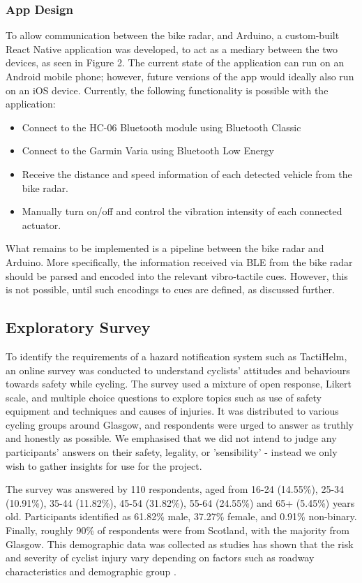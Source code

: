 \documentclass{interim}
\begin{document}
\subsubsection{App Design}
To allow communication between the bike radar, and Arduino, a custom-built React Native application was developed, to act as a mediary between the two devices, as seen in Figure 2. The current state of the application can run on an Android mobile phone; however, future versions of the app would ideally also run on an iOS device. Currently, the following functionality is possible with the application:
\begin{itemize}
    \item Connect to the HC-06 Bluetooth module using Bluetooth Classic
    \item Connect to the Garmin Varia using Bluetooth Low Energy
    \item Receive the distance and speed information of each detected vehicle from the bike radar.
    \item Manually turn on/off and control the vibration intensity of each connected actuator.
\end{itemize}

What remains to be implemented is a pipeline between the bike radar and Arduino. More specifically, the information received via BLE from the bike radar should be parsed and encoded into the relevant vibro-tactile cues. However, this is not possible, until such encodings to cues are defined, as discussed further.


\subsection{Exploratory Survey}\label{sec:survey}
To identify the requirements of a hazard notification system such as TactiHelm, an online survey was conducted to understand cyclists' attitudes and behaviours towards safety while cycling. The survey used a mixture of open response, Likert scale, and multiple choice questions to explore topics such as use of safety equipment and techniques and causes of injuries. It was distributed to various cycling groups around Glasgow, and respondents were urged to answer as truthly and honestly as possible. We emphasised that we did not intend to judge any participants' answers on their safety, legality, or 'sensibility' - instead we only wish to gather insights for use for the project.

The survey was answered by 110 respondents, aged from 16-24 (14.55\%), 25-34 (10.91\%), 35-44 (11.82\%), 45-54 (31.82\%), 55-64 (24.55\%) and 65+ (5.45\%) years old. Participants identified as 61.82\% male, 37.27\% female, and 0.91\% non-binary. Finally, roughly 90\% of respondents were from Scotland, with the majority from Glasgow. This demographic data was collected as studies has shown that the risk and severity of cyclist injury vary depending on factors such as roadway characteristics and demographic group \cite{BEHNOOD201735}.
\end{document}
